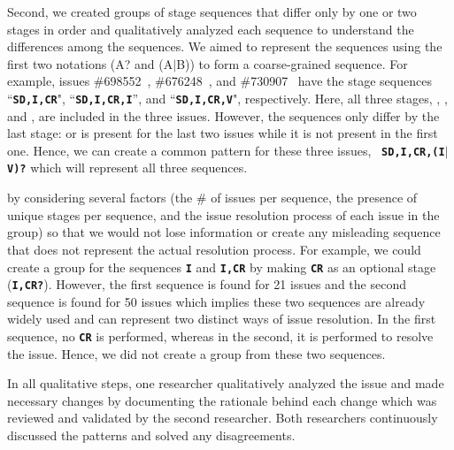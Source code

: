 Second, we created groups of stage sequences that differ only by one or two stages in order and qualitatively analyzed each sequence to understand the differences among the sequences. We aimed to represent the sequences using the first two notations (\ie A? and (A$\mid$B)) to form a coarse-grained sequence. For example, issues \#698552~\cite{firefox-bug-698552}, \#676248~\cite{firefox-bug-676248}, and \#730907~\cite{firefox-bug-730907} have the stage sequences ``\texttt{\textbf{SD,I,CR}}", ``\texttt{\textbf{SD,I,CR,I}}'', and ``\texttt{\textbf{SD,I,CR,V}}", respectively. Here, all three stages, \sds, \impls, and \crvs, are included in the three issues. However, the sequences only differ by the last stage: \impls or \vers is present for the last two issues while it is not present in the first one. Hence, we can create a common pattern for these three issues, \ie\ \texttt{\textbf{SD,I,CR,(I$\mid$V)?}} which will represent all three sequences.

 by considering several factors (\eg the \# of issues per sequence, the presence of unique stages per sequence, and the issue resolution process of each issue in the group) so that we would not lose information or create any misleading sequence that does not represent the actual resolution process. For example, we could create a group for the sequences \texttt{\textbf{I}} and \texttt{\textbf{I,CR}} by making \texttt{\textbf{CR}} as an optional stage (\ie  \texttt{\textbf{I,CR?}}). However, the first sequence is found for 21 issues and the second sequence is found for 50 issues which implies these two sequences are already widely used and can represent two distinct ways of issue resolution. In the first sequence, no \texttt{\textbf{CR}} is performed, whereas in the second, it is performed to resolve the issue. Hence, we did not create a group from these two sequences.

In all qualitative steps, one researcher qualitatively analyzed the issue and made necessary changes by documenting the rationale behind each change which was reviewed and validated by the second researcher. Both researchers continuously discussed the patterns and solved any disagreements.













